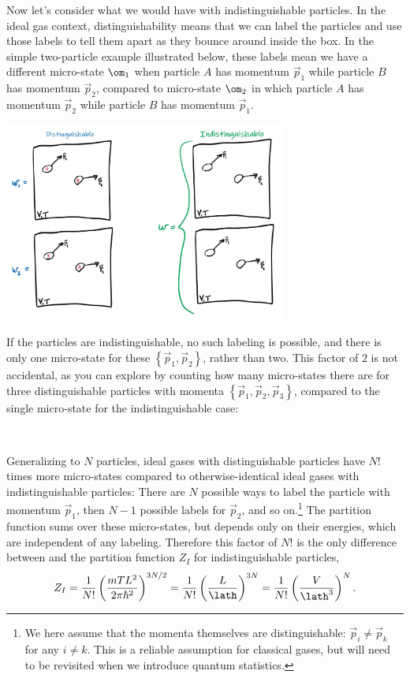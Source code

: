 Now let's consider what we would have with indistinguishable particles.
In the ideal gas context, distinguishability means that we can label the particles and use those labels to tell them apart as they bounce around inside the box.
In the simple two-particle example illustrated below, these labels mean we have a different micro-state $\om_1$ when particle $A$ has momentum $\vec p_1$ while particle $B$ has momentum $\vec p_2$, compared to micro-state $\om_2$ in which particle $A$ has momentum $\vec p_2$ while particle $B$ has momentum $\vec p_1$.
\begin{center}
  \includegraphics[width=0.7\textwidth]{figs/unit04_distinguish.pdf}
\end{center}
If the particles are indistinguishable, no such labeling is possible, and there is only one micro-state for these $\left\{\vec p_1, \vec p_2\right\}$, rather than two.
This factor of $2$ is not accidental, as you can explore by counting how many micro-states there are for three distinguishable particles with momenta $\left\{\vec p_1, \vec p_2, \vec p_3\right\}$, compared to the single micro-state for the indistinguishable case:
\begin{mdframed}
  \ \\[100 pt]
\end{mdframed}

Generalizing to $N$ particles, ideal gases with distinguishable particles have $N!$ times more micro-states compared to otherwise-identical ideal gases with indistinguishable particles: There are $N$ possible ways to label the particle with momentum $\vec{p}_1$, then $N - 1$ possible labels for $\vec{p}_2$, and so on.\footnote{We here assume that the momenta themselves are distinguishable: $\vec{p}_i \neq \vec{p}_k$ for any $i \neq k$.  This is a reliable assumption for classical gases, but will need to be revisited when we introduce quantum statistics.}
The partition function sums over these micro-states, but depends only on their energies, which are independent of any labeling.
Therefore this factor of $N!$ is the only difference between  and the partition function $Z_I$ for indistinguishable particles,
\begin{equation}
  \label{eq:ideal_indis}
  Z_I = \frac{1}{N!} \left(\frac{mTL^2}{2\pi\hbar^2}\right)^{3N / 2} = \frac{1}{N!} \left(\frac{L}{\lath}\right)^{3N} = \frac{1}{N!} \left(\frac{V}{\lath^3}\right)^N.
\end{equation}



